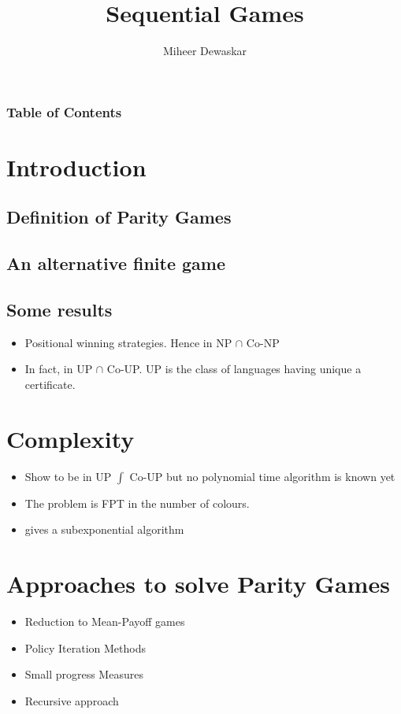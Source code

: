 \documentclass{beamer}
\title{Sequential Games}
\author[M. Dewaskar]{Miheer Dewaskar}
\institute[CMI]{Chennai Mathematical Institute}
\begin{document}
  \frame{\titlepage}

  \begin{frame}
    \frametitle{Table of Contents}
    \tableofcontents
  \end{frame}

  \section{Introduction}
    \subsection{Definition of Parity Games}

    \subsection{An alternative finite game}

    \subsection{Some results}
    \begin{itemize}
      \item Positional winning strategies. Hence in NP $\cap$ Co-NP
      \item In fact, in UP $\cap$ Co-UP. UP is the class of languages having unique a certificate.
    \end{itemize}

  \section{Complexity}
    \begin{itemize}
      \item Show to be in UP $\int$ Co-UP but no polynomial time algorithm is known yet
      \item The problem is FPT in the number of colours.
      \item \cite{subexp} gives a subexponential algorithm
    \end{itemize}

  \section{Approaches to solve Parity Games}
    \begin{itemize}
      \item Reduction to Mean-Payoff games
      \item Policy Iteration Methods
      \item Small progress Measures
      \item Recursive approach
    \end{itemize}
\end{document}
